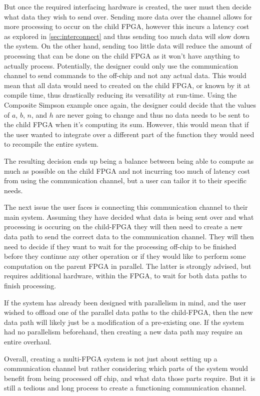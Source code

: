 But once the required interfacing hardware is created, the user must then decide what data they wish to send over. Sending more data over the channel allows for more processing to occur on the child FPGA, however this incurs a latency cost as explored in \autoref{sec:interconnect} and thus sending too much data will slow down the system. On the other hand, sending too little data will reduce the amount of processing that can be done on the child FPGA as it won't have anything to actually process. Potentially, the designer could only use the communication channel to send commands to the off-chip and not any actual data. This would mean that all data would need to created on the child FPGA, or known by it at compile time, thus drastically reducing its versatility at run-time. Using the Composite Simpson example once again, the designer could decide that the values of $a$, $b$, $n$, and $h$ are never going to change and thus no data needs to be sent to the child FPGA when it's computing its sum. However, this would mean that if the user wanted to integrate over a different part of the function they would need to recompile the entire system. 

The resulting decision ends up being a balance between being able to compute as much as possible on the child FPGA and not incurring too much of latency cost from using the communication channel, but a user can tailor it to their specific needs.

The next issue the user faces is connecting this communication channel to their main system. Assuming they have decided what data is being sent over and what processing is occuring on the child-FPGA they will then need to create a new data path to send the correct data to the communication channel. They will then need to decide if they want to wait for the processing off-chip to be finished before they continue any other operation or if they would like to perform some computation on the parent FPGA in parallel. The latter is strongly advised, but requires additional hardware, within the FPGA, to wait for both data paths to finish processing.

If the system has already been designed with parallelism in mind, and the user wished to offload one of the parallel data paths to the child-FPGA, then the new data path will likely just be a modification of a pre-existing one. If the system had no parallelism beforehand, then creating a new data path may require an entire overhaul.

Overall, creating a multi-FPGA system is not just about setting up a communication channel but rather considering which parts of the system would benefit from being processed off chip, and what data those parts require. But it is still a tedious and long process to create a functioning communication channel.

